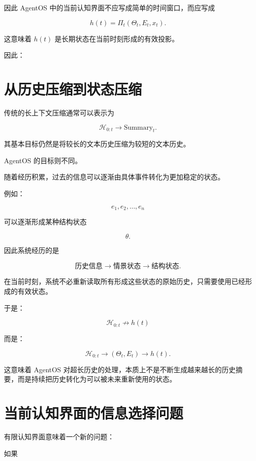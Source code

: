 因此 AgentOS 中的当前认知界面不应写成简单的时间窗口，而应写成

\[
h(t)
=
\Pi_t
\left(
\Theta_t,
E_t,
x_t
\right).
\]

这意味着 $h(t)$ 是长期状态在当前时刻形成的有效投影。

因此：

\begin{statementbox}
\centering
{}
\end{statementbox}


\section{从历史压缩到状态压缩}

传统的长上下文压缩通常可以表示为

\[
\mathcal{H}_{0:t}
\rightarrow
\text{Summary}_t.
\]

其基本目标仍然是将较长的文本历史压缩为较短的文本历史。

AgentOS 的目标则不同。

随着经历积累，过去的信息可以逐渐由具体事件转化为更加稳定的状态。

例如：

\[
e_1,e_2,\ldots,e_n
\]

可以逐渐形成某种结构状态

\[
\theta.
\]

因此系统经历的是

\[
\text{历史信息}
\rightarrow
\text{情景状态}
\rightarrow
\text{结构状态}.
\]

在当前时刻，系统不必重新读取所有形成这些状态的原始历史，只需要使用已经形成的有效状态。

于是：

\[
\mathcal{H}_{0:t}
\not\rightarrow
h(t)
\]

而是：

\[
\mathcal{H}_{0:t}
\rightarrow
(\Theta_t,E_t)
\rightarrow
h(t).
\]

这意味着 AgentOS 对超长历史的处理，本质上不是不断生成越来越长的历史摘要，而是持续把历史转化为可以被未来重新使用的状态。


\section{当前认知界面的信息选择问题}

有限认知界面意味着一个新的问题：

如果

